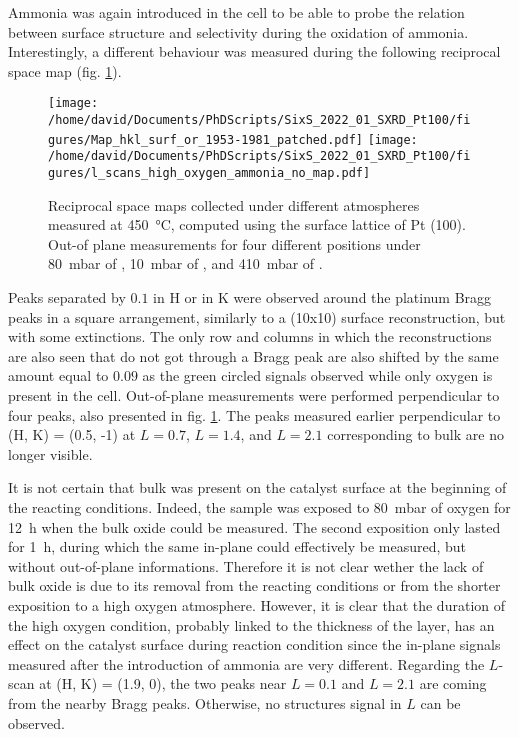 Ammonia was again introduced in the cell to be able to probe the relation between surface structure and selectivity during the oxidation of ammonia.
Interestingly, a different behaviour was measured during the following reciprocal space map (fig. \ref{fig:MapsAndLScansPt100HighOxAmmonia}).

\begin{figure}[!htb]
    \centering
    \texttt{[image: /home/david/Documents/PhDScripts/SixS\_2022\_01\_SXRD\_Pt100/figures/Map\_hkl\_surf\_or\_1953-1981\_patched.pdf]}
    \texttt{[image: /home/david/Documents/PhDScripts/SixS\_2022\_01\_SXRD\_Pt100/figures/l\_scans\_high\_oxygen\_ammonia\_no\_map.pdf]}
    \caption{
        Reciprocal space maps collected under different atmospheres measured at \qty{450}{\degreeCelsius}, computed using the surface lattice of Pt (100).
        Out-of plane measurements for four different positions under \qty{80}{\milli\bar} of \dioxygen, \qty{10}{\milli\bar} of \ammonia, and \qty{410}{\milli\bar} of \argon.
    }
    \label{fig:MapsAndLScansPt100HighOxAmmonia}
\end{figure}

Peaks separated by $0.1$ in H or in K were observed around the platinum Bragg peaks in a square arrangement, similarly to a (10x10) surface reconstruction, but with some extinctions.
The only row and columns in which the reconstructions are also seen that do not got through a Bragg peak are also shifted by the same amount equal to $0.09$ as the green circled signals observed while only oxygen is present in the cell.
Out-of-plane measurements were performed perpendicular to four peaks, also presented in fig. \ref{fig:MapsAndLScansPt100HighOxAmmonia}.
The peaks measured earlier perpendicular to (H, K) = (0.5, -1) at $L=0.7$, $L=1.4$, and $L=2.1$ corresponding to bulk  are no longer visible.

It is not certain that bulk  was present on the catalyst surface at the beginning of the reacting conditions.
Indeed, the sample was exposed to \qty{80}{\milli\bar} of oxygen for \qty{12}{\hour} when the bulk oxide could be measured.
The second exposition only lasted for \qty{1}{\hour}, during which the same in-plane could effectively be measured, but without out-of-plane informations.
Therefore it is not clear wether the lack of bulk oxide is due to its removal from the reacting conditions or from the shorter exposition to a high oxygen atmosphere.
However, it is clear that the duration of the high oxygen condition, probably linked to the thickness of the  layer, has an effect on the catalyst surface during reaction condition since the in-plane signals measured after the introduction of ammonia are very different.
Regarding the $L$-scan at (H, K) = (1.9, 0), the two peaks near $L=0.1$ and $L=2.1$ are coming from the nearby Bragg peaks.
Otherwise, no structures signal in $L$ can be observed.

